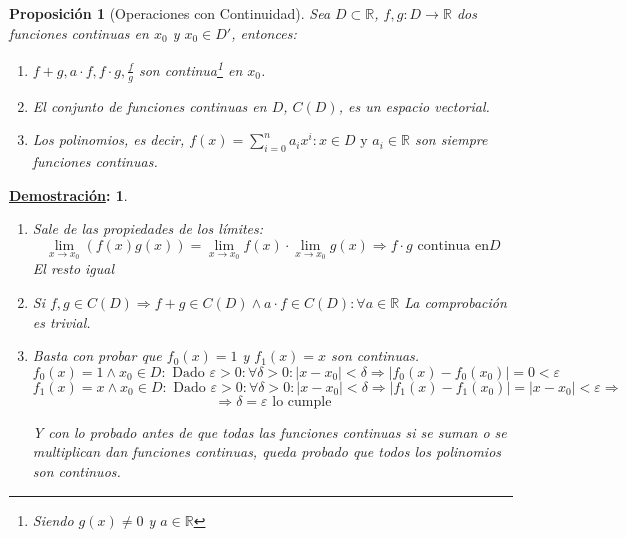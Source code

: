 \documentclass[10pt,a4paper,openright]{book}
\theoremstyle{break}
\newtheorem*{prop}{Proposición}
\newtheorem*{demo}{\underline{Demostración}:}
\begin{document}
\begin{prop}[Operaciones con Continuidad]
Sea $D\subset \mathbb R$, $f,g: D\longrightarrow \mathbb R$ dos funciones continuas en $x_0$ y $x_0\in D'$, entonces:
\begin{enumerate}
\item $f+g, a\cdot f, f\cdot g, \frac{f}{g}$ son continua\footnote{Siendo $g(x)\neq 0$ y $a\in \mathbb R$} en $x_0$.

\item El conjunto de funciones continuas en $D$, $C(D)$, es un espacio vectorial.

\item Los polinomios, es decir, $f(x)=\sum_{i=0}^n a_ix^i: x\in D\mbox{ y } a_i\in \mathbb R$ son siempre funciones continuas.
\end{enumerate}
\end{prop}
\begin{demo}
\begin{enumerate}
\item Sale de las propiedades de los límites:
$$\lim_{x\rightarrow x_0}(f(x)g(x))=\lim_{x\rightarrow x_0}f(x)\cdot \lim_{x\rightarrow x_0}g(x)\Rightarrow f\cdot g \mbox{ continua en} D$$
El resto igual

\item Si $f,g\in C(D)\Rightarrow f+g\in C(D)\wedge a\cdot f\in C(D): \forall a\in \mathbb R$
La comprobación es trivial.

\item Basta con probar que $f_0(x)=1$ y $f_1(x)=x$ son continuas.
$$f_0(x)=1\wedge x_0 \in D: \mbox{ Dado }\varepsilon>0: \forall \delta >0: |x-x_0|<\delta\Rightarrow |f_0(x)-f_0(x_0)|=0<\varepsilon$$
$$f_1(x)=x\wedge x_0 \in D:\mbox{ Dado }\varepsilon>0: \forall \delta >0: |x-x_0|<\delta\Rightarrow |f_1(x)-f_1(x_0)|=|x-x_0|<\varepsilon\Rightarrow$$
$$\Rightarrow \delta =\varepsilon \mbox{ lo cumple}$$

Y con lo probado antes de que todas las funciones continuas si se suman o se multiplican dan funciones continuas, queda probado que todos los polinomios son continuos.
\end{enumerate}
\end{demo}
\end{document}
